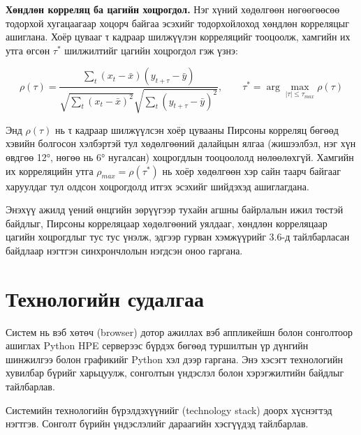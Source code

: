 \textbf{Хөндлөн корреляц ба цагийн хоцрогдол.} Нэг хүний хөдөлгөөн нөгөөгөөсөө тодорхой хугацаагаар хоцорч байгаа эсэхийг тодорхойлоход хөндлөн корреляцыг ашиглана. Хоёр цувааг τ кадраар шилжүүлэн корреляцийг тооцоолж, хамгийн их утга өгсөн \(\tau^{*}\) шилжилтийг цагийн хоцрогдол гэж үзнэ:

\begin{equation}
\rho(\tau) = \frac{\sum_{t} (x_t - \bar{x})(y_{t+\tau} - \bar{y})}{\sqrt{\sum_{t} (x_t - \bar{x})^2} \sqrt{\sum_{t} (y_{t+\tau} - \bar{y})^2}}, \qquad \tau^{*} = \arg\max_{|\tau| \le \tau_{max}} \rho(\tau)
\end{equation}

Энд \(\rho(\tau)\) нь τ кадраар шилжүүлсэн хоёр цувааны Пирсоны корреляц бөгөөд хэвийн болгосон хэлбэртэй тул хөдөлгөөний далайцын ялгаа (жишээлбэл, нэг хүн өвдгөө 12°, нөгөө нь 6° нугалсан) хоцрогдлын тооцоололд нөлөөлөхгүй. Хамгийн их корреляцийн утга \(\rho_{max} = \rho(\tau^{*})\) нь хоёр хөдөлгөөн хэр сайн таарч байгааг харуулдаг тул олдсон хоцрогдолд итгэх эсэхийг шийдэхэд ашиглагдана.

Энэхүү ажилд үений өнцгийн зөрүүгээр тухайн агшны байрлалын ижил төстэй байдлыг, Пирсоны корреляцаар хөдөлгөөний уялдааг, хөндлөн корреляцаар цагийн хоцрогдлыг тус тус үнэлж, эдгээр гурван хэмжүүрийг 3.6-д тайлбарласан байдлаар нэгтгэн синхрончлолын нэгдсэн оноо гаргана.

\section{Технологийн судалгаа}

Систем нь вэб хөтөч (browser) дотор ажиллах вэб аппликейшн болон сонголтоор ашиглах Python HPE серверээс бүрдэх бөгөөд туршилтын үр дүнгийн шинжилгээ болон графикийг Python хэл дээр гаргана. Энэ хэсэгт технологийн хувилбар бүрийг харьцуулж, сонголтын үндэслэл болон хэрэгжилтийн байдлыг тайлбарлав.

Системийн технологийн бүрэлдэхүүнийг (technology stack) доорх хүснэгтэд нэгтгэв. Сонголт бүрийн үндэслэлийг дараагийн хэсгүүдэд тайлбарлав.

